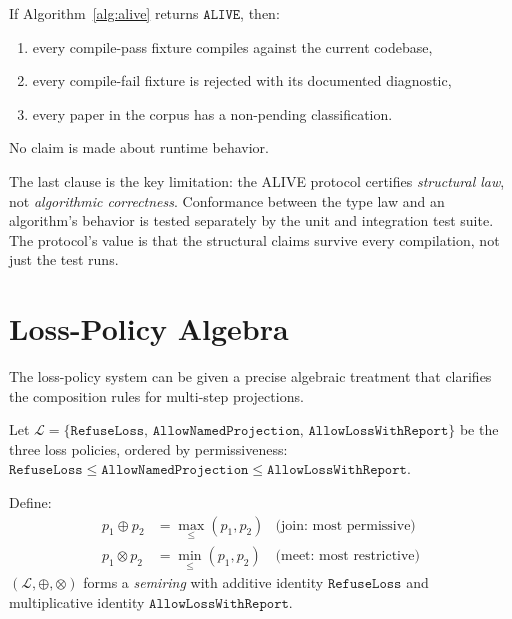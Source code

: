 \begin{theorem}
If Algorithm~\ref{alg:alive} returns $\mathtt{ALIVE}$, then:
\begin{enumerate}
  \item every compile-pass fixture compiles against the current codebase,
  \item every compile-fail fixture is rejected with its documented diagnostic,
  \item every paper in the corpus has a non-pending classification.
\end{enumerate}
No claim is made about runtime behavior.
\end{theorem}

The last clause is the key limitation: the ALIVE protocol certifies
\emph{structural law}, not \emph{algorithmic correctness}. Conformance between
the type law and an algorithm's behavior is tested separately by the unit and
integration test suite. The protocol's value is that the structural claims
survive every compilation, not just the test runs.

\section{Loss-Policy Algebra}
\label{sec:conc-loss}

The loss-policy system can be given a precise algebraic treatment that clarifies
the composition rules for multi-step projections.

\begin{definition}
Let $\mathcal{L} = \{\mathtt{RefuseLoss},\, \mathtt{AllowNamedProjection},\,
\mathtt{AllowLossWithReport}\}$ be the three loss policies, ordered by
permissiveness: $\mathtt{RefuseLoss} \leq \mathtt{AllowNamedProjection}
\leq \mathtt{AllowLossWithReport}$.

Define:
\begin{align*}
  p_1 \oplus p_2 &= \max_{\leq}(p_1, p_2) & \text{(join: most permissive)} \\
  p_1 \otimes p_2 &= \min_{\leq}(p_1, p_2) & \text{(meet: most restrictive)}
\end{align*}
$(\mathcal{L}, \oplus, \otimes)$ forms a \emph{semiring} with
additive identity $\mathtt{RefuseLoss}$ and multiplicative identity
$\mathtt{AllowLossWithReport}$.
\end{definition}

